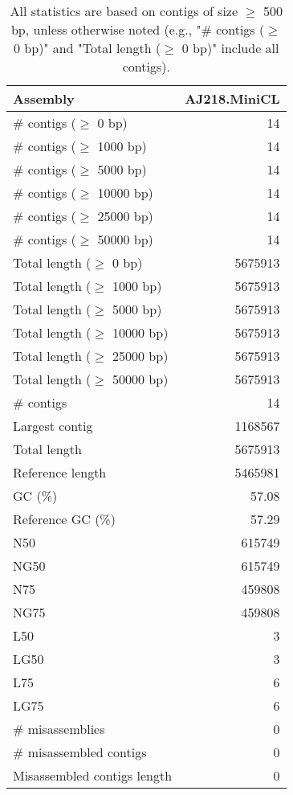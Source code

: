 \documentclass[12pt,a4paper]{article}
\begin{document}
\begin{table}[ht]
\begin{center}
\caption{All statistics are based on contigs of size $\geq$ 500 bp, unless otherwise noted (e.g., "\# contigs ($\geq$ 0 bp)" and "Total length ($\geq$ 0 bp)" include all contigs).}
\begin{tabular}{|l*{1}{|r}|}
\hline
Assembly & AJ218.MiniCL \\ \hline
\# contigs ($\geq$ 0 bp) & 14 \\ \hline
\# contigs ($\geq$ 1000 bp) & 14 \\ \hline
\# contigs ($\geq$ 5000 bp) & 14 \\ \hline
\# contigs ($\geq$ 10000 bp) & 14 \\ \hline
\# contigs ($\geq$ 25000 bp) & 14 \\ \hline
\# contigs ($\geq$ 50000 bp) & 14 \\ \hline
Total length ($\geq$ 0 bp) & 5675913 \\ \hline
Total length ($\geq$ 1000 bp) & 5675913 \\ \hline
Total length ($\geq$ 5000 bp) & 5675913 \\ \hline
Total length ($\geq$ 10000 bp) & 5675913 \\ \hline
Total length ($\geq$ 25000 bp) & 5675913 \\ \hline
Total length ($\geq$ 50000 bp) & 5675913 \\ \hline
\# contigs & 14 \\ \hline
Largest contig & 1168567 \\ \hline
Total length & 5675913 \\ \hline
Reference length & 5465981 \\ \hline
GC (\%) & 57.08 \\ \hline
Reference GC (\%) & 57.29 \\ \hline
N50 & 615749 \\ \hline
NG50 & 615749 \\ \hline
N75 & 459808 \\ \hline
NG75 & 459808 \\ \hline
L50 & 3 \\ \hline
LG50 & 3 \\ \hline
L75 & 6 \\ \hline
LG75 & 6 \\ \hline
\# misassemblies & 0 \\ \hline
\# misassembled contigs & 0 \\ \hline
Misassembled contigs length & 0 \\ \hline

\end{tabular}
\end{center}
\end{table}
\end{document}
